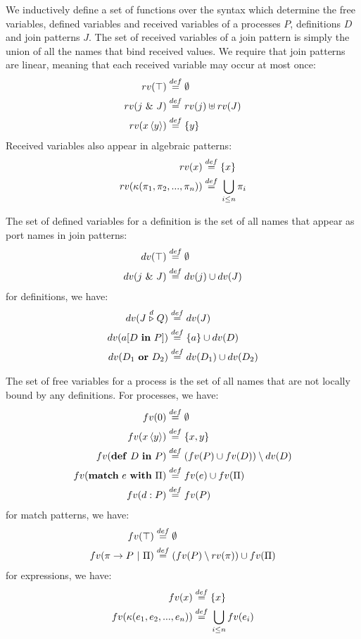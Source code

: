 We inductively define a set of functions over the syntax which determine the
free variables, defined variables and received variables of a processes $P$,
definitions $D$ and join patterns $J$. The set of received variables of a join
pattern is simply the union of all the names that bind received values. We
require that join patterns are linear, meaning that each received variable may
occur at most once:
\begin{align*}
rv(\top) \defEq{}& \emptyset \\
rv(j~\&~J) \defEq{}& rv(j) \uplus rv(J) \\
rv(\atm x<y>) \defEq{}& \{y\}
\end{align*}
Received variables also appear in algebraic patterns:
\begin{align*}
rv(x) \stackrel{def}{=}{}& \{x\} \\
rv(\kappa(\pi_1, \pi_2, ..., \pi_n)) \stackrel{def}{=}{}& \bigcup_{i \leq n} \pi_i \\
\end{align*}

The set of defined variables for a definition is the set of all names that
appear as port names in join patterns:
\begin{align*}
 dv(\top) \stackrel{def}{=}{}& \emptyset \\
 dv(j~\&~J) \stackrel{def}{=}{}& dv(j) \cup dv(J) \\
\end{align*}
for definitions, we have:
\begin{align*}
 dv(J \stackrel{d}{\triangleright} Q) \stackrel{def}{=}{}& dv(J) \\
 dv(a[D~\mathbf{in}~P]) \stackrel{def}{=}{}& \{a\} \cup dv(D) \\
 dv(D_1~\mathbf{or}~D_2) \stackrel{def}{=}{}& dv(D_1) \cup dv(D_2)
\end{align*}

The set of free variables for a process is the set of all names that are not
locally bound by any definitions. For processes, we have:
\begin{align*}
 fv(0) \defEq{}& \emptyset \\
 fv(\atm x<y>) \defEq{}& \{x,y\} \\
 fv(\mathbf{def}~D~\mathbf{in}~P) \defEq{}& (fv(P) \cup fv(D)) \setminus dv(D)
 \\
 fv(\mathbf{match}~e~\mathbf{with}~\Pi) \defEq{}& fv(e) \cup fv(\Pi) \\
 fv(d : P) \defEq{}& fv(P) \\
\end{align*}
for match patterns, we have:
\begin{align*}
 fv(\top) \stackrel{def}{=}{}& \emptyset \\
 fv(\pi \rightarrow P~|~\Pi) \stackrel{def}{=}{}& (fv(P) \setminus rv(\pi)) \cup fv(\Pi)
\end{align*}
for expressions, we have:
\begin{align*}
 fv(x) \stackrel{def}{=}{}& \{x\} \\
 fv(\kappa(e_1, e_2, ..., e_n)) \stackrel{def}{=}{}& \bigcup_{i \leq n} fv(e_i)
\end{align*}

